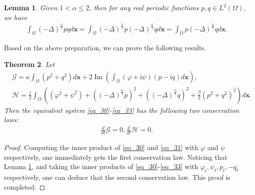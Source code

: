 \documentclass[preprint,compress,3p,10pt,fleqn]{elsarticle}
\numberwithin{equation}{section}
\newtheorem{theorem}{Theorem}[section]
\newtheorem{lemma}[theorem]{Lemma}
\begin{document}
\begin{lemma}\label{lem1}
 \cite{fuStructurepreservingAlgorithmsTwodimensional2020} Given $1<\alpha \leq 2$, then for any real periodic functions $p, q \in L^{2}(\Omega)$, we have
\begin{align}\label{eq_22}
\int_{\Omega}(-\Delta)^{\frac{\alpha}{2}} p q d \boldsymbol{x}=\int_{\Omega}(-\Delta)^{\frac{\alpha}{4}} p(-\Delta)^{\frac{\alpha}{4}} q d \boldsymbol{x}=\int_{\Omega} p(-\Delta)^{\frac{\alpha}{2}} q d \boldsymbol{x}.
\end{align}
\end{lemma}


Based on the above preparation, we can prove the following results.
\begin{theorem}	\label{thm2_1}
Let
\begin{align}
&\mathcal{G}=\kappa\int_{\Omega}(p^2+q^2) d \boldsymbol{x}+2\operatorname{Im}(\int_{\Omega}(\varphi+\mathrm{i}\psi)(p-\mathrm{i}q)d \boldsymbol{x}),\label{eq_34} \\
&\mathcal{H}=\frac{1}{2}\int_{\Omega}\left((\varphi^2+\psi^2)+\left((-\Delta)^{\frac{\alpha}{4}} p\right)^{2}+\left((-\Delta)^{\frac{\alpha}{4}} q\right)^{2}+\frac{\beta}{2}(p^2+q^2)^{2}\right) d \boldsymbol{x}.\label{eq_35}
\end{align}
Then the equivalent system \eqref{eq_30}-\eqref{eq_33} has the following two conservation laws:
\begin{align}
\frac{d}{d t} \mathcal{G}=0, \frac{d}{d t} \mathcal{H}=0.
\end{align}
\end{theorem}

\begin{proof}
Computing the inner product of \eqref{eq_30} and \eqref{eq_31} with $\varphi$ and $\psi$ respectively, one immediately gets the first conservation law.
Noticing that Lemma \ref{lem1}, and taking the inner products of \eqref{eq_30}-\eqref{eq_33} with $\varphi_{t}, \psi_{t}, p_{t},-q_{t}$ respectively, one can deduce that the second conservation law. This proof is completed.
\end{proof}
\end{document}
